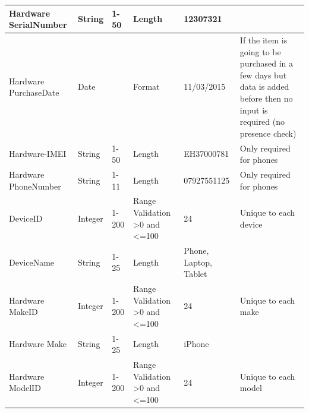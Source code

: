 \begin{center}
\begin{longtable}{|p{2cm}|p{1.14cm}|p{1.1cm}|p{1.7cm}|p{1.7cm}|p{2cm}|}
Hardware SerialNumber                & String                                  & 1-50                                 & Length                                   & 12307321              &                       \\ \hline
Hardware PurchaseDate                & Date                                  &                                  & Format                                   & 11/03/2015              & If the item is going to be purchased in a few days but data is added before then no input is required (no presence check)                       \\ \hline
Hardware-IMEI                & String                                  &          1-50                        & Length                                   & EH37000781               & Only required for phones                      \\ \hline
Hardware PhoneNumber                & String                                  &1-11                                  & Length                                   & 07927551125              &   Only required for phones                      \\ \hline
DeviceID                      & Integer                                  & 1-200                                & Range Validation \textgreater0 and \textless=100                                   & 24                 & Unique to each device                       \\ \hline
DeviceName                        & String                                  & 1-25                                 & Length                                   & Phone, Laptop, Tablet                &                       \\ \hline
Hardware MakeID                      & Integer                                  & 1-200                                & Range Validation \textgreater0 and \textless=100                                   & 24                 & Unique to each make                       \\ \hline
Hardware Make                        & String                                  & 1-25                                 & Length                                   & iPhone                &                       \\ \hline
Hardware ModelID		& Integer                                  & 1-200                                & Range Validation \textgreater0 and \textless=100                                   & 24                 & Unique to each model                       \\ \hline

\end{longtable}
\end{center}
